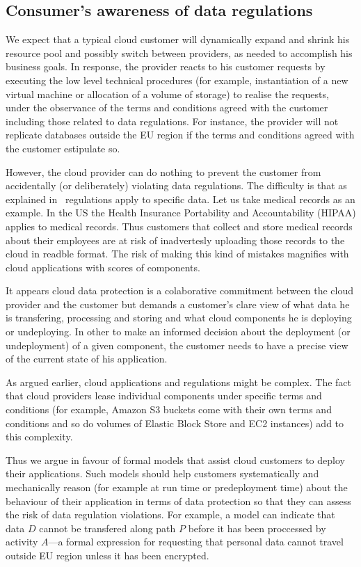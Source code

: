 \documentclass[runningheads,a4paper]{llncs}
\begin{document}
\subsection{Consumer's awareness of data regulations}
We expect that a typical cloud customer will dynamically expand 
and shrink his resource pool and possibly switch between 
providers, as needed to accomplish his business goals.
In response, the provider reacts to his customer requests by executing 
the low level technical procedures (for example, instantiation of a new
virtual machine or allocation of a volume of storage) to realise the 
requests, under the observance of the terms and conditions 
agreed with the customer including those related to data
regulations. For instance, the provider will not replicate
databases outside the EU region if the terms and conditions
agreed with the customer estipulate so.

However, the cloud provider can do nothing to prevent the 
customer from accidentally (or deliberately) violating 
data regulations. The difficulty is that as explained
in~\cite{Winkler2011} regulations apply to specific data. 
Let us take medical records as an example.
In the US the Health Insurance Portability and Accountability 
(HIPAA) applies to medical records. Thus
customers that collect and store medical records about their employees
are at risk of inadvertesly uploading those records to the cloud in 
readble format. The risk of making this kind of mistakes
magnifies with cloud applications with scores of components.


It appears cloud data protection is a colaborative commitment between 
the cloud provider and the customer but demands a customer's
clare view of what data he is transfering, processing and storing
and what cloud components he is deploying or undeploying. In other 
to make an informed decision about the deployment (or undeployment) of 
a given component, the customer needs to have a precise
view of the current state of his application.

As argued earlier, cloud applications and regulations might be 
complex. The fact that cloud providers lease individual components
under specific terms and conditions (for example, Amazon S3
buckets come with their own terms and conditions and so
do volumes of Elastic Block Store and EC2 instances) add to 
this complexity.

Thus we argue in favour of formal models that assist 
cloud customers to deploy their applications. Such models should
help customers systematically and mechanically reason (for example at
run time or predeployment time) about the
behaviour of their application in terms of data protection so
that they can assess the risk of data regulation violations.
For example, a model can indicate that data $D$ cannot
be transfered along path $P$ before it has been proccessed
by activity $A$---a formal expression for requesting that
personal data cannot travel outside EU region unless it has
been encrypted. 
 
\end{document}
